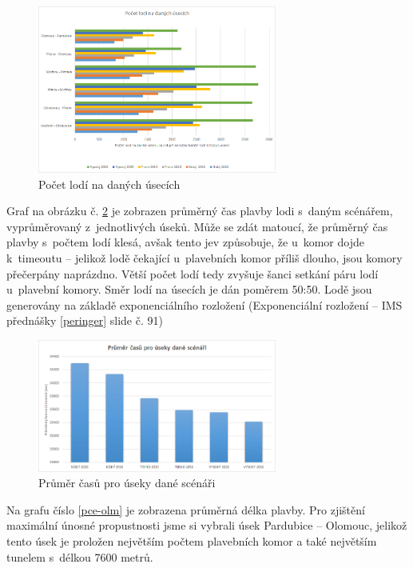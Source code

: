 \documentclass[11pt,a4paper]{article}
\begin{document}
      \begin{figure}[H]
        \centering
        \includegraphics[width=0.7\textwidth, natwidth=940, natheight=325]
                        {pocet_lodi.png}
        \caption{Počet lodí na daných úsecích} \label{pocet_lodi}
      \end{figure}

      Graf na obrázku č. \ref{cas} je zobrazen průměrný čas plavby lodi s~daným
      scénářem, vyprůměrovaný z~jednotlivých úseků.
      Může se zdát matoucí, že průměrný čas plavby s~počtem lodí klesá, avšak
      tento jev způsobuje, že u~komor dojde k~timeoutu -- jelikož lodě čekající
      u~plavebních komor příliš dlouho, jsou komory přečerpány naprázdno.
      Větší počet lodí tedy zvyšuje šanci setkání páru lodí u~plavební komory.
      Směr lodí na úsecích je dán poměrem 50:50. Lodě jsou generovány na základě
      exponenciálního rozložení (Exponenciální rozložení -- IMS přednášky
      \ref{peringer} slide č. 91)

      \begin{figure}[H]
        \centering
        \includegraphics[width=0.7\textwidth, natwidth=940, natheight=325]
                        {cas.png}
        \caption{Průměr časů pro úseky dané scénáři} \label{cas}
      \end{figure}

      Na grafu číslo \ref{pce-olm} je zobrazena průměrná délka plavby.
      Pro zjištění maximální únosné propustnosti jsme si vybrali úsek
      Pardubice -- Olomouc, jelikož tento úsek je proložen největším počtem
      plavebních komor a také největším tunelem s~délkou 7600 metrů.
\end{document}
